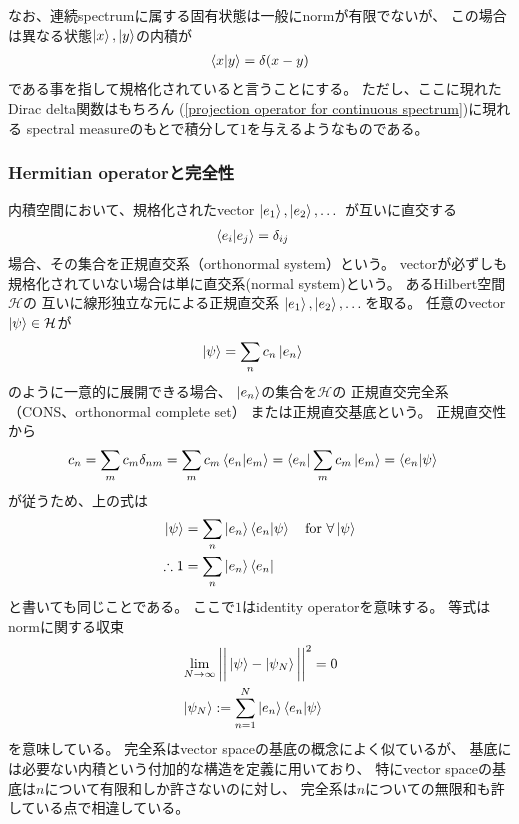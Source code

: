 なお、連続spectrumに属する固有状態は一般にnormが有限でないが、
この場合は異なる状態$\ket{x}, \ket{y}$の内積が
\begin{align}
    \braket{x|y} = \delta(x-y)
\end{align}
である事を指して規格化されていると言うことにする。
ただし、ここに現れたDirac delta関数はもちろん
(\ref{projection operator for continuous spectrum})に現れる
spectral measureのもとで積分して$1$を与えるようなものである。

\subsubsection{Hermitian operatorと完全性}

内積空間において、規格化されたvector
$\ket{e_1},\ket{e_2},\dots$
が互いに直交する
\begin{align}
    \braket{e_i | e_j} &= \delta_{ij}
\end{align}
場合、その集合を正規直交系（orthonormal system）という。
vectorが必ずしも規格化されていない場合は単に直交系(normal system)という。
あるHilbert空間$\mathcal{H}$の
互いに線形独立な元による正規直交系
$\ket{e_1},\ket{e_2},\dots$を取る。
任意のvector
$\ket{\psi} \in \mathcal{H}$が
\begin{align}
    \ket{\psi}
    &=\sum_n c_n \ket{e_n}
\end{align}
のように一意的に展開できる場合、
$\ket{e_n}$の集合を$\mathcal{H}$の
正規直交完全系（CONS、orthonormal complete set）
または正規直交基底という。
正規直交性から
\begin{align}
    c_n &=
    \sum_m c_m \delta_{nm}
    =\sum_m c_m \braket{e_n|e_m}
    = \bra{e_n} \sum_m c_m \ket{e_m}
    = \braket{e_n | \psi}
\end{align}
が従うため、上の式は
\begin{align}
    \ket{\psi}
    &=\sum_n \ket{e_n} \braket{e_n | \psi}
    \quad\text{for $\forall \ket{\psi}$}
\notag\\
\therefore
    1
    &=
    \sum _n \ket{e_n}\bra{e_n}
\end{align}
と書いても同じことである。
ここで$1$はidentity operatorを意味する。
等式はnormに関する収束
\begin{subequations}
\begin{align}
    &\lim_{N\to\infty}\bigg|\bigg|
        \ket{\psi} - \ket{\psi_N}
    \bigg|\bigg|^2
    = 0
\label{convergence of norm}
\\
    &\ket{\psi_N}
    :=
    \sum_{n=1}^N \ket{e_n} \braket{e_n | \psi}
\end{align}
\end{subequations}
を意味している。
完全系はvector spaceの基底の概念によく似ているが、
基底には必要ない内積という付加的な構造を定義に用いており、
特にvector spaceの基底は$n$について有限和しか許さないのに対し、
完全系は$n$についての無限和も許している点で相違している。

